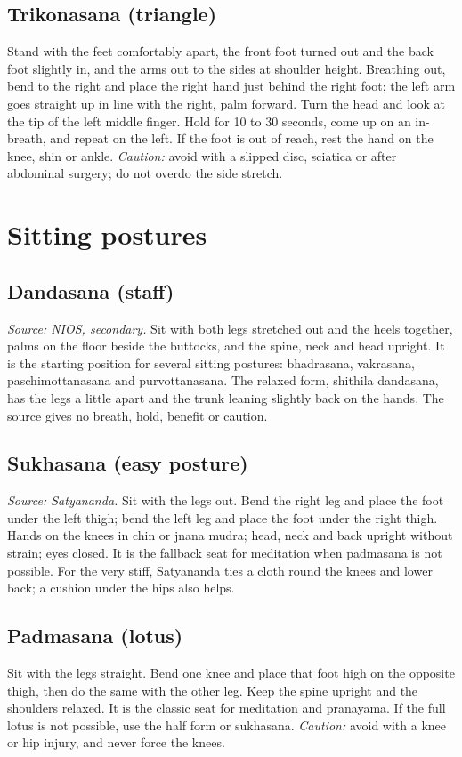 \subsection*{Trikonasana (triangle)}
Stand with the feet comfortably apart, the front foot turned out and the back foot slightly in, and the arms out to the sides at shoulder height. Breathing out, bend to the right and place the right hand just behind the right foot; the left arm goes straight up in line with the right, palm forward. Turn the head and look at the tip of the left middle finger. Hold for 10 to 30 seconds, come up on an in-breath, and repeat on the left. If the foot is out of reach, rest the hand on the knee, shin or ankle.
\textit{Caution:} avoid with a slipped disc, sciatica or after abdominal surgery; do not overdo the side stretch.

\section{Sitting postures}

\subsection*{Dandasana (staff)}
\textit{Source: NIOS, secondary.} Sit with both legs stretched out and the heels together, palms on the floor beside the buttocks, and the spine, neck and head upright. It is the starting position for several sitting postures: bhadrasana, vakrasana, paschimottanasana and purvottanasana. The relaxed form, shithila dandasana, has the legs a little apart and the trunk leaning slightly back on the hands. The source gives no breath, hold, benefit or caution.

\subsection*{Sukhasana (easy posture)}
\textit{Source: Satyananda.} Sit with the legs out. Bend the right leg and place the foot under the left thigh; bend the left leg and place the foot under the right thigh. Hands on the knees in chin or jnana mudra; head, neck and back upright without strain; eyes closed. It is the fallback seat for meditation when padmasana is not possible. For the very stiff, Satyananda ties a cloth round the knees and lower back; a cushion under the hips also helps.

\subsection*{Padmasana (lotus)}
Sit with the legs straight. Bend one knee and place that foot high on the opposite thigh, then do the same with the other leg. Keep the spine upright and the shoulders relaxed. It is the classic seat for meditation and pranayama. If the full lotus is not possible, use the half form or sukhasana.
\textit{Caution:} avoid with a knee or hip injury, and never force the knees.

